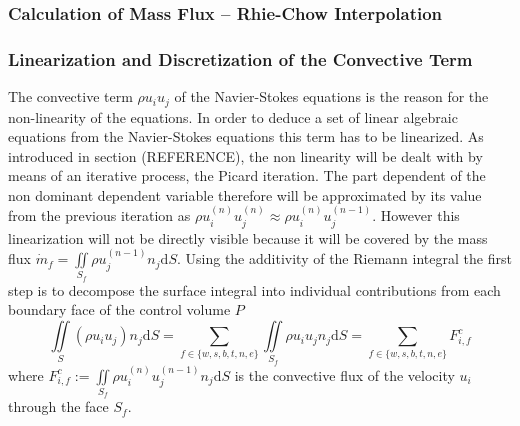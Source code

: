       \subsubsection{Calculation of Mass Flux -- Rhie-Chow Interpolation}

      \subsubsection{Linearization and Discretization of the Convective Term}

      The convective term \(\rho u_i u_j\) of the Navier-Stokes equations is the reason for the non-linearity of the equations. In order to deduce a set of linear algebraic equations from the Navier-Stokes equations this term has to be linearized. As introduced in section (REFERENCE), the non linearity will be dealt with by means of an iterative process, the Picard iteration. The part dependent of the non dominant dependent variable therefore will be approximated by its value from the previous iteration as \( \rho u_i^{(n)} u_j^{(n)} \approx \rho u_i^{(n)} u_j^{(n-1)} \). However this linearization will not be directly visible because it will be covered by the mass flux \(\dot{m}_f = \iint\limits_{S_f} \rho u_j^{(n-1)} n_j \mathrm{d}S \). Using the additivity of the Riemann integral the first step is to decompose the surface integral into individual contributions from each boundary face of the control volume \(P\)
      \begin{displaymath}
      \iint\limits_S (\rho u_i u_j)n_j \mathrm{d}S
      = \sum_{f \in \{w,s,b,t,n,e\}} \iint\limits_{S_f}\rho u_{i} u_{j} n_{j} \mathrm{d}S
      = \sum_{f \in \{w,s,b,t,n,e\}} F_{i,f}^{c}
      \end{displaymath}
      where \(F_{i,f}^c := \iint\limits_{S_f} \rho u_{i}^{(n)} u_{j}^{(n-1)} n_{j} \mathrm{d}S \) is the convective flux of the velocity \(u_i\) through the face \(S_f\). 
      
